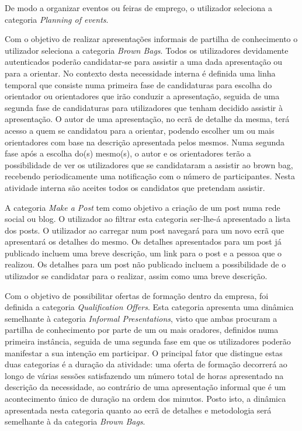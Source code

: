 De modo a organizar eventos ou feiras de emprego, o utilizador seleciona a categoria \textit{Planning of events}.

Com o objetivo de realizar apresentações informais de partilha de conhecimento o utilizador seleciona a categoria \textit{Brown Bags}. 
Todos os utilizadores devidamente autenticados poderão candidatar-se para assistir a uma dada apresentação ou para a orientar. 
No contexto desta necessidade interna é definida uma linha temporal que consiste numa primeira fase de candidaturas para escolha do orientador 
ou orientadores que irão conduzir a apresentação, seguida de uma segunda fase de candidaturas para utilizadores que tenham decidido assistir à apresentação. 
O autor de uma apresentação, no ecrã de detalhe da mesma, terá acesso a quem se candidatou para a orientar, podendo escolher um ou mais orientadores 
com base na descrição apresentada pelos mesmos. 
Numa segunda fase após a escolha do(s) mesmo(s), o autor e os orientadores terão a possibilidade de ver os utilizadores que se 
candidataram a assistir ao brown bag, recebendo periodicamente uma notificação com o número de participantes. 
Nesta atividade interna são aceites todos os candidatos que pretendam assistir.

A categoria \textit{Make a Post} tem como objetivo a criação de um post numa rede social ou blog. 
O utilizador ao filtrar esta categoria ser-lhe-á apresentado a lista dos posts. 
O utilizador ao carregar num post navegará para um novo ecrã que apresentará os detalhes do mesmo. 
Os detalhes apresentados para um post já publicado incluem uma breve descrição, um link para o post e a pessoa que o realizou. 
Os detalhes para um post não publicado incluem a possibilidade de o utilizador se candidatar para o realizar, assim como uma breve descrição.

Com o objetivo de possibilitar ofertas de formação dentro da empresa, foi definida a categoria \textit{Qualification Offers}. 
Esta categoria apresenta uma dinâmica semelhante à categoria \textit{Informal Presentations}, visto que ambas procuram a partilha de 
conhecimento por parte de um ou mais oradores, definidos numa primeira instância, seguida de uma segunda fase em que os utilizadores 
poderão manifestar a sua intenção em participar. 
O principal fator que distingue estas duas categorias é a duração da atividade: 
uma oferta de formação decorrerá ao longo de várias sessões satisfazendo um número total de horas apresentado na descrição da necessidade, 
ao contrário de uma apresentação informal que é um acontecimento único de duração na ordem dos minutos. 
Posto isto, a dinâmica apresentada nesta categoria quanto ao ecrã de detalhes e metodologia será semelhante à da categoria \textit{Brown Bags}.

